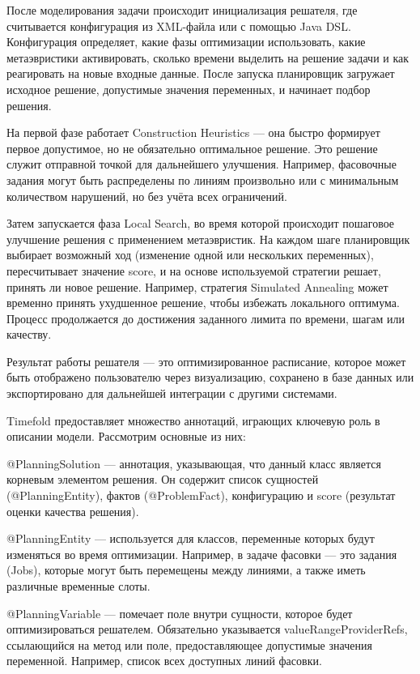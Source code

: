 После моделирования задачи происходит инициализация решателя, где считывается конфигурация из XML-файла или с помощью Java DSL. Конфигурация определяет, какие фазы оптимизации использовать, какие метаэвристики активировать, сколько времени выделить на решение задачи и как реагировать на новые входные данные. После запуска планировщик загружает исходное решение, допустимые значения переменных, и начинает подбор решения.

На первой фазе работает Construction Heuristics — она быстро формирует первое допустимое, но не обязательно оптимальное решение. Это решение служит отправной точкой для дальнейшего улучшения. Например, фасовочные задания могут быть распределены по линиям произвольно или с минимальным количеством нарушений, но без учёта всех ограничений.

Затем запускается фаза Local Search, во время которой происходит пошаговое улучшение решения с применением метаэвристик. На каждом шаге планировщик выбирает возможный ход (изменение одной или нескольких переменных), пересчитывает значение score, и на основе используемой стратегии решает, принять ли новое решение. Например, стратегия Simulated Annealing может временно принять ухудшенное решение, чтобы избежать локального оптимума. Процесс продолжается до достижения заданного лимита по времени, шагам или качеству.

Результат работы решателя — это оптимизированное расписание, которое может быть отображено пользователю через визуализацию, сохранено в базе данных или экспортировано для дальнейшей интеграции с другими системами.

Timefold предоставляет множество аннотаций, играющих ключевую роль в описании модели. Рассмотрим основные из них:

@PlanningSolution — аннотация, указывающая, что данный класс является корневым элементом решения. Он содержит список сущностей (@PlanningEntity), фактов (@ProblemFact), конфигурацию и score (результат оценки качества решения).

@PlanningEntity — используется для классов, переменные которых будут изменяться во время оптимизации. Например, в задаче фасовки — это задания (Jobs), которые могут быть перемещены между линиями, а также иметь различные временные слоты.

@PlanningVariable — помечает поле внутри сущности, которое будет оптимизироваться решателем. Обязательно указывается valueRangeProviderRefs, ссылающийся на метод или поле, предоставляющее допустимые значения переменной. Например, список всех доступных линий фасовки.

